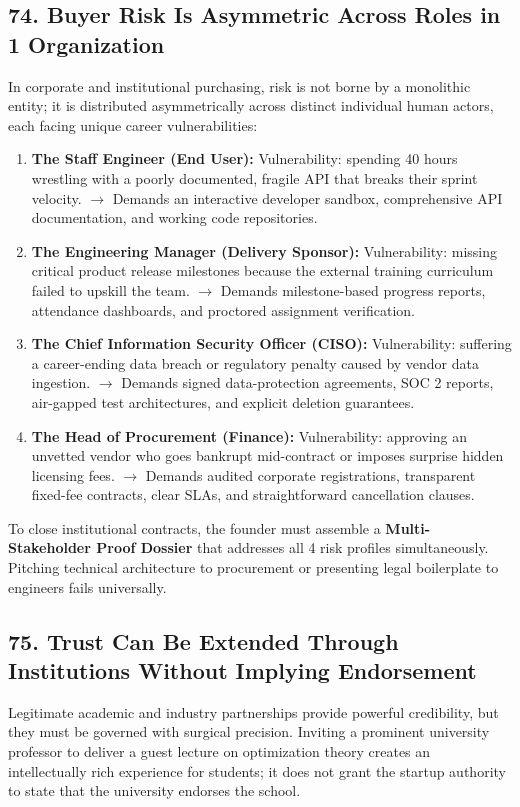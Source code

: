 \subsection*{74. Buyer Risk Is Asymmetric Across Roles in 1 Organization}

In corporate and institutional purchasing, risk is not borne by a monolithic entity; it is distributed asymmetrically across distinct individual human actors, each facing unique career vulnerabilities:
\begin{enumerate}
\item \textbf{The Staff Engineer (End User):} Vulnerability: spending 40 hours wrestling with a poorly documented, fragile API that breaks their sprint velocity. $\rightarrow$ Demands an interactive developer sandbox, comprehensive API documentation, and working code repositories.
\item \textbf{The Engineering Manager (Delivery Sponsor):} Vulnerability: missing critical product release milestones because the external training curriculum failed to upskill the team. $\rightarrow$ Demands milestone-based progress reports, attendance dashboards, and proctored assignment verification.
\item \textbf{The Chief Information Security Officer (CISO):} Vulnerability: suffering a career-ending data breach or regulatory penalty caused by vendor data ingestion. $\rightarrow$ Demands signed data-protection agreements, SOC 2 reports, air-gapped test architectures, and explicit deletion guarantees.
\item \textbf{The Head of Procurement (Finance):} Vulnerability: approving an unvetted vendor who goes bankrupt mid-contract or imposes surprise hidden licensing fees. $\rightarrow$ Demands audited corporate registrations, transparent fixed-fee contracts, clear SLAs, and straightforward cancellation clauses.
\end{enumerate}

To close institutional contracts, the founder must assemble a \textbf{Multi-Stakeholder Proof Dossier} that addresses all 4 risk profiles simultaneously. Pitching technical architecture to procurement or presenting legal boilerplate to engineers fails universally.

\subsection*{75. Trust Can Be Extended Through Institutions Without Implying Endorsement}

Legitimate academic and industry partnerships provide powerful credibility, but they must be governed with surgical precision. Inviting a prominent university professor to deliver a guest lecture on optimization theory creates an intellectually rich experience for students; it does not grant the startup authority to state that the university endorses the school.


